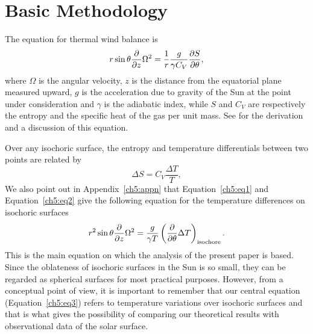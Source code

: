 \section{Basic Methodology}
\label{ch5:method}

The equation for thermal wind balance is
\begin{equation}
r \sin{\theta} \frac{\partial}{\partial z} \Omega^2=\frac{1}{r}\frac{g}{\gamma C_V} \frac{\partial S}{\partial \theta},
\label{ch5:eq1}
\end{equation}
where $\Omega$ is the angular velocity, $z$ is the distance from the equatorial plane
measured upward, $g$ is the acceleration due to gravity of the Sun at the point
under consideration and $\gamma$ is the adiabatic index, while $S$ and $C_V$ are respectively the entropy and the specific heat of the gas per
unit mass. See \citet{Choudhuri2021b} for the derivation and a discussion of this equation.

Over any isochoric surface,
the entropy and temperature differentials between two points are related by
\begin{equation}
\Delta S = C_V \frac{\Delta T}{T},
\label{ch5:eq2}
\end{equation}
We also point out in Appendix~\ref{ch5:appn} that 
Equation~\ref{ch5:eq1} and Equation~\ref{ch5:eq2} give the following equation for the temperature
differences on isochoric surfaces
\begin{equation}
r^2 \sin \theta \frac{\partial}{\partial z} \Omega^2 = \frac{g}{\gamma T} \left( \frac{\partial}{\partial \theta} \Delta T \right)_{\rm isochore}.
\label{ch5:eq3}
\end{equation}
%
This is the main equation on which the analysis of the present paper is based. Since the oblateness of isochoric surfaces
in the Sun is so small, they can be regarded as spherical surfaces
for most practical purposes.  However, from a conceptual point
of view, it is important to remember that our central equation (Equation~\ref{ch5:eq3})
refers to temperature variations over isochoric surfaces and
that is what gives the possibility of comparing our theoretical
results with observational data of the solar surface.


